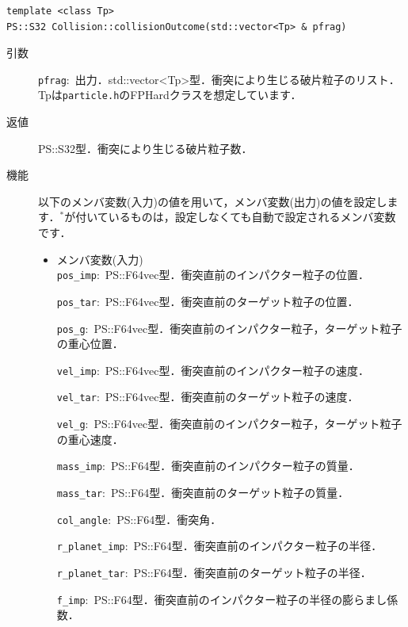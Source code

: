 \documentclass[12pt,a4paper,dvipdfmx]{jsarticle}
\begin{document}
\begin{screen}
\begin{verbatim}
template <class Tp>
PS::S32 Collision::collisionOutcome(std::vector<Tp> & pfrag)
\end{verbatim}
\end{screen}

\begin{description}
\item[引数]

\texttt{pfrag}:\ 出力．std::vector<Tp>型．衝突により生じる破片粒子のリスト．Tpは\texttt{particle.h}のFPHardクラスを想定しています．

\item[返値]

PS::S32型．衝突により生じる破片粒子数．

\item[機能]

以下のメンバ変数(入力)の値を用いて，メンバ変数(出力)の値を設定します．${}^{*}$が付いているものは，設定しなくても自動で設定されるメンバ変数です．
\begin{itemize}

\item
メンバ変数(入力)\\
\texttt{pos\_imp}:\ PS::F64vec型．衝突直前のインパクター粒子の位置．

\texttt{pos\_tar}:\ PS::F64vec型．衝突直前のターゲット粒子の位置．

\texttt{pos\_g}:\ PS::F64vec型．衝突直前のインパクター粒子，ターゲット粒子の重心位置．

\texttt{vel\_imp}:\ PS::F64vec型．衝突直前のインパクター粒子の速度．

\texttt{vel\_tar}:\ PS::F64vec型．衝突直前のターゲット粒子の速度．

\texttt{vel\_g}:\ PS::F64vec型．衝突直前のインパクター粒子，ターゲット粒子の重心速度．

\texttt{mass\_imp}:\ PS::F64型．衝突直前のインパクター粒子の質量．

\texttt{mass\_tar}:\ PS::F64型．衝突直前のターゲット粒子の質量．

\texttt{col\_angle}:\ PS::F64型．衝突角．

\texttt{r\_planet\_imp}:\ PS::F64型．衝突直前のインパクター粒子の半径．

\texttt{r\_planet\_tar}:\ PS::F64型．衝突直前のターゲット粒子の半径．

\texttt{f\_imp}:\ PS::F64型．衝突直前のインパクター粒子の半径の膨らまし係数．


\end{itemize}
\end{description}
\end{document}

